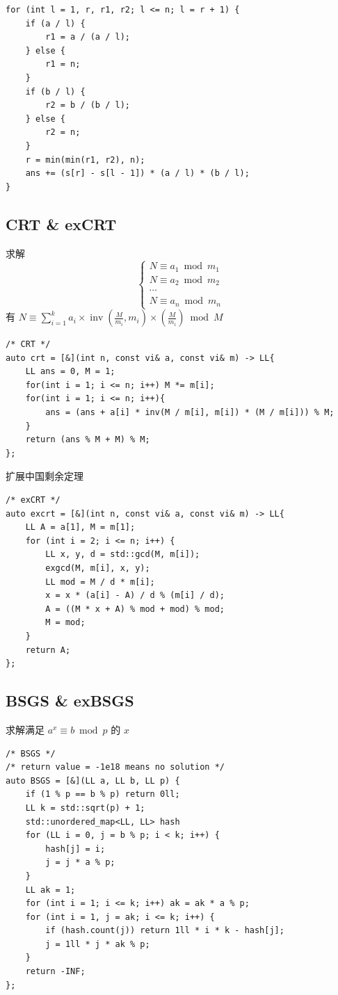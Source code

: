 \documentclass[UTF8, a4paper, titlepage, twoside]{ctexart}
\begin{document}
\begin{lstlisting}[style=cpp]
for (int l = 1, r, r1, r2; l <= n; l = r + 1) {
    if (a / l) {
        r1 = a / (a / l);
    } else {
        r1 = n;
    }
    if (b / l) {
        r2 = b / (b / l);
    } else {
        r2 = n;
    }
    r = min(min(r1, r2), n);
    ans += (s[r] - s[l - 1]) * (a / l) * (b / l);
}
\end{lstlisting}

\subsection{ CRT \& exCRT }

求解
$$
    \left\{\begin{array}{ll}N \equiv a_{1} \bmod m_{1} \\ N \equiv a_{2} \bmod m_{2} \\  \cdots \\ N \equiv a_{n} \bmod m_{n}\end{array}\right.
$$
有 $N \equiv \sum\limits_{i=1}^{k} a_{i} \times \operatorname{inv}\left(\frac{M}{m_{i}}, m_{i}\right) \times\left(\frac{M}{m_{i}}\right)\bmod M$

\begin{lstlisting}[style=cpp]
/* CRT */
auto crt = [&](int n, const vi& a, const vi& m) -> LL{
    LL ans = 0, M = 1;
    for(int i = 1; i <= n; i++) M *= m[i];
    for(int i = 1; i <= n; i++){
        ans = (ans + a[i] * inv(M / m[i], m[i]) * (M / m[i])) % M;
    }
    return (ans % M + M) % M;
};
\end{lstlisting}

扩展中国剩余定理

\begin{lstlisting}[style=cpp]
/* exCRT */
auto excrt = [&](int n, const vi& a, const vi& m) -> LL{
    LL A = a[1], M = m[1];
    for (int i = 2; i <= n; i++) {
        LL x, y, d = std::gcd(M, m[i]);
        exgcd(M, m[i], x, y);
        LL mod = M / d * m[i];
        x = x * (a[i] - A) / d % (m[i] / d); 
        A = ((M * x + A) % mod + mod) % mod;
        M = mod;
    }
    return A;
};
\end{lstlisting}

\subsection{ BSGS \& exBSGS }

求解满足 $a ^ x \equiv b \bmod p$ 的 $x$

\begin{lstlisting}[style=cpp]
/* BSGS */
/* return value = -1e18 means no solution */
auto BSGS = [&](LL a, LL b, LL p) {
    if (1 % p == b % p) return 0ll;
    LL k = std::sqrt(p) + 1;
    std::unordered_map<LL, LL> hash
    for (LL i = 0, j = b % p; i < k; i++) {
        hash[j] = i;
        j = j * a % p;
    }
    LL ak = 1;
    for (int i = 1; i <= k; i++) ak = ak * a % p;
    for (int i = 1, j = ak; i <= k; i++) {
        if (hash.count(j)) return 1ll * i * k - hash[j];
        j = 1ll * j * ak % p;
    }
    return -INF;
};
\end{lstlisting}
\end{document}
